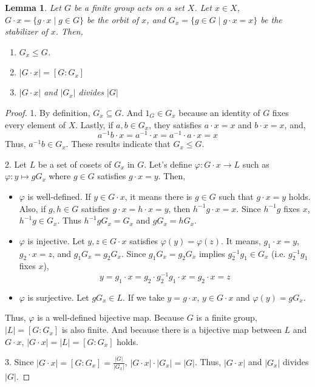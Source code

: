 \documentclass{article}
\newtheorem{lemma}{Lemma}
\begin{document}
\begin{lemma}\label{lem-orb-fix}
  Let \(G\) be a finite group acts on a set \(X\).
  Let \(x \in X\), \(G \cdot x = \{g \cdot x \mid g \in G\}\) be the orbit of \(x\), and \(G_x = \{g \in G \mid g \cdot x = x\}\) be the stabilizer of \(x\).
  Then,
  \begin{enumerate}
  \item \(G_x \le G\).
  \item \(|G \cdot x| = [G : G_x]\)
  \item \(|G \cdot x|\) and \(|G_x|\) divides \(|G|\)
  \end{enumerate}
\end{lemma}
\begin{proof}
1.
  By definition, \(G_x \subseteq G\). And \(1_G \in G_x\) because an identity of \(G\) fixes every element of \(X\). Lastly, if \(a, b \in G_x\), they satisfies \(a \cdot x = x\) and \(b \cdot x = x\), and,
  \[ a^{-1}b \cdot x = a^{-1} \cdot x = a^{-1} \cdot a \cdot x = x\]
  Thus, \(a^{-1}b \in G_x\). These results indicate that \(G_x \le G\).

2. Let \(L\) be a set of cosets of \(G_x\) in \(G\).
  Let's define \(\varphi: G \cdot x \to L\) such as
  \(\varphi: y \mapsto g G_x\) where \(g \in G\) satisfies \(g \cdot x = y\).
  Then,
  \begin{itemize}
  \item \(\varphi\) is well-defined.
    If \(y \in G \cdot x\), it means there is \(g \in G\) such that \(g \cdot x = y\) holds. Also, if \(g, h \in G\) satisfies \(g \cdot x = h \cdot x = y\), then \(h^{-1}g \cdot x = x\). Since \(h^{-1}g\) fixes \(x\), \(h^{-1}g \in G_x\). Thus \(h^{-1}g G_x = G_x\) and \(g G_x = h G_x\).
  \item \(\varphi\) is injective.
    Let \(y, z \in G \cdot x\) satisfies \(\varphi(y) = \varphi(z)\).
    It means, \(g_1 \cdot x = y\), \(g_2 \cdot x = z\), and \(g_1 G_x = g_2 G_x\).
    Since \(g_1 G_x = g_2 G_x\) implies \(g_2^{-1}g_1 \in G_x\) (i.e. \(g_2^{-1}g_1\) fixes \(x\)),
    \[y = g_1 \cdot x = g_2 \cdot g_2^{-1} g_1 \cdot x = g_2 \cdot x = z\]
  \item \(\varphi\) is surjective.
    Let \(g G_x \in L\). If we take \(y = g \cdot x\), \(y \in G \cdot x\) and \(\varphi(y) = g G_x\).
  \end{itemize}
  Thus, \(\varphi\) is a well-defined bijective map.
  Because \(G\) is a finite group, \(|L| = [G : G_x]\) is also finite.
  And because there is a bijective map between \(L\) and \(G \cdot x\),
  \(|G \cdot x| = |L| = [G : G_x]\) holds.

3. Since \(|G \cdot x| = [G : G_x] = \frac{|G|}{|G_x|}\), \(|G \cdot x| \cdot |G_x| = |G|\). Thus, \(|G \cdot x|\) and \(|G_x|\) divides \(|G|\).
\end{proof}
\end{document}
